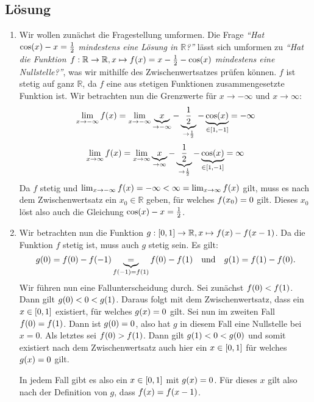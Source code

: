 \documentclass[german,12pt]{homework}
\newcommand{\RR}{\mathbb{R}}
\DeclarePairedDelimiter{\enbrace}{(}{)}
\DeclarePairedDelimiter{\benbrace}{[}{]}
\begin{document}
    \subsection*{Lösung}
    \begin{enumerate}
        \item Wir wollen zunächst die Fragestellung umformen. Die Frage \emph{``Hat \(\cos\enbrace*{x} - x = \frac{1}{2}\) mindestens eine Lösung in \(\RR\)?''} lässt sich umformen zu \emph{``Hat die Funktion \(f: \RR \to \RR, x \mapsto f\enbrace*{x} = x - \frac{1}{2} - \cos\enbrace*{x}\) mindestens eine Nullstelle?''}, was wir mithilfe des Zwischenwertsatzes prüfen können. \(f\) ist stetig auf ganz \(\RR\), da \(f\) eine aus stetigen Funktionen zusammengesetzte Funktion ist. Wir betrachten nun die Grenzwerte für \(x \to -\infty\) und \(x \to \infty\):
        \[\lim_{x \to -\infty}f\enbrace*{x} = \lim_{x \to -\infty}\underbrace{x}_{\to -\infty} - \underbrace{\frac{1}{2}}_{\to \frac{1}{2}} - \underbrace{\cos\enbrace*{x}}_{\in \benbrace*{1, -1}} = -\infty\]
        \[\lim_{x \to \infty}f\enbrace*{x} = \lim_{x \to \infty}\underbrace{x}_{\to \infty} - \underbrace{\frac{1}{2}}_{\to \frac{1}{2}} - \underbrace{\cos\enbrace*{x}}_{\in \benbrace*{1, -1}} = \infty\]
        Da \(f\) stetig und \(\lim_{x \to -\infty}f\enbrace*{x} = -\infty < \infty = \lim_{x \to \infty}f\enbrace*{x}\) gilt, muss es nach dem Zwischenwertsatz ein \(x_0 \in \RR\) geben, für welches \(f\enbrace*{x_0} = 0\) gilt. Dieses \(x_0\) löst also auch die Gleichung \(\cos\enbrace*{x} - x = \frac{1}{2}\).
        \item Wir betrachten nun die Funktion \(g: \benbrace*{0, 1} \to \RR, x \mapsto f\enbrace*{x} - f\enbrace*{x  - 1}\). Da die Funktion \(f\) stetig ist, muss auch \(g\) stetig sein. Es gilt:
        \[g\enbrace*{0} = f\enbrace*{0} - f\enbrace*{-1} \underbrace{=}_{f\enbrace*{-1} = f\enbrace*{1}} f\enbrace*{0} - f\enbrace*{1} \quad \text{und} \quad g\enbrace*{1} = f\enbrace*{1} - f\enbrace*{0}.\]
        Wir führen nun eine Fallunterscheidung durch. Sei zunächst \(f\enbrace*{0} < f\enbrace*{1}\). Dann gilt \(g\enbrace*{0} < 0 < g\enbrace*{1}\). Daraus folgt mit dem Zwischenwertsatz, dass ein \(x \in \benbrace*{0, 1}\) existiert, für welches \(g\enbrace*{x} = 0\) gilt. Sei nun im zweiten Fall \(f\enbrace*{0} = f\enbrace*{1}\). Dann ist \(g\enbrace*{0} = 0\), also hat \(g\) in diesem Fall eine Nullstelle bei \(x = 0\). Als letztes sei \(f\enbrace*{0} > f\enbrace*{1}\). Dann gilt \(g\enbrace*{1} < 0 < g\enbrace*{0}\) und somit existiert nach dem Zwischenwertsatz auch hier ein \(x \in \benbrace*{0, 1}\) für welches \(g\enbrace*{x} = 0\) gilt.

        In jedem Fall gibt es also ein \(x \in \benbrace*{0, 1}\) mit \(g\enbrace*{x} = 0\). Für dieses \(x\) gilt also nach der Definition von \(g\), dass \(f\enbrace*{x} = f\enbrace*{x - 1}\).
    \end{enumerate}
\end{document}
